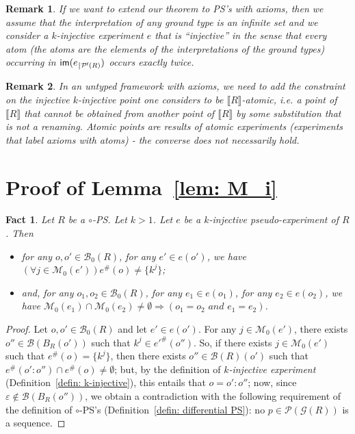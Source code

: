 \documentclass{article}
\theoremstyle{plain}
\newtheorem{fact}[theorem]{Fact}
\newtheorem{rem}{Remark}
\newcommand{\groundof}[1]{\mathcal{G}(#1)}
\def\restriction#1#2{\mathchoice
              {\setbox1\hbox{${\displaystyle #1}_{\scriptstyle #2}$}
              \restrictionaux{#1}{#2}}
              {\setbox1\hbox{${\textstyle #1}_{\scriptstyle #2}$}
              \restrictionaux{#1}{#2}}
              {\setbox1\hbox{${\scriptstyle #1}_{\scriptscriptstyle #2}$}
              \restrictionaux{#1}{#2}}
              {\setbox1\hbox{${\scriptscriptstyle #1}_{\scriptscriptstyle #2}$}
              \restrictionaux{#1}{#2}}}
\def\restrictionaux#1#2{{#1\,\smash{\vrule height .8\ht1 depth .85\dp1}}_{\,#2}}
\newcommand{\im}[1]{\textsf{im}(#1)}
\newcommand{\emptysequence}{\varepsilon}
\newcommand{\ports}[1]{\mathcal{P}(#1)}
\newcommand{\conclusions}[1]{\mathcal{P}^{\textsf{f}}(#1)}
\newcommand{\boxes}[1]{\mathcal{B}(#1)}
\newcommand{\boxesatzero}[1]{\mathcal{B}_{0}(#1)}
\begin{document}
\begin{rem}\label{remark: with axioms}
If we want to extend our theorem to PS's with axioms, then we assume that the interpretation of any ground type is an infinite set and we consider a $k$-injective experiment $e$ that is ``injective'' in the sense that every atom (the atoms are the elements of the interpretations of the ground types) occurring in $\im{\restriction{e}{\conclusions{R}}}$ occurs exactly twice.
\end{rem}

\begin{rem}\label{remark: untyped framework}
In an untyped framework with axioms, we need to add the constraint on the injective $k$-injective point one considers to be {$\llbracket R \rrbracket$-atomic}, i.e. a point of $\llbracket R \rrbracket$ that cannot be obtained from another point of $\llbracket R \rrbracket$ by some substitution that is not a renaming. Atomic points are results of atomic experiments (experiments that label axioms with atoms) - the converse does not necessarily hold.
\end{rem}



\onecolumn

\appendix





\section{Proof of Lemma~\ref{lem: M_i}}




\begin{fact}\label{fact: M_0 pairwise disjoint}
Let $R$ be a $\circ$-PS. 
Let $k > 1$. Let $e$ be a $k$-injective pseudo-experiment of $R$. Then 
\begin{itemize}
\item for any $o, o' \in \boxesatzero{R}$, for any $e' \in e(o')$, we have $(\forall j \in \mathcal{M}_0(e')) e^\#(o) \not= \{ k^j \}$;
\item and, for any $o_1, o_2 \in \boxesatzero{R}$, for any $e_1 \in e(o_1)$, for any $e_2 \in e(o_2)$, we have $\mathcal{M}_0(e_1) \cap \mathcal{M}_0(e_2) \not= \emptyset \Rightarrow (o_1 = o_2 \textit{ and } e_1 = e_2)$.
\end{itemize}
\end{fact}

\begin{proof}
Let $o, o' \in \boxesatzero{R}$ and let $e' \in e(o')$. For any $j \in \mathcal{M}_0(e')$, there exists $o'' \in \boxes{B_R(o')}$ such that $k^j \in e'^\#(o'')$. So, if there exists $j \in \mathcal{M}_0(e')$ such that $e^\#(o) = \{ k^j \}$, then there exists $o'' \in \boxes{R}(o')$ such that $e^\#(o':o'') \cap e^\#(o) \not= \emptyset$; but, by the definition of \emph{$k$-injective experiment} (Definition~\ref{defin: k-injective}), this entails that $o = o':o''$; now, since $\emptysequence \notin \boxes{B_R(o'')}$, we obtain a contradiction with the following requirement of the definition of $\circ$-PS's (Definition~\ref{defin: differential PS}): no $p \in \ports{\groundof{R}}$ is a sequence.
\end{proof}
\end{document}
